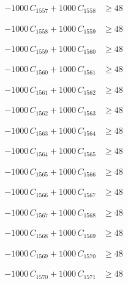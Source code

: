 \documentclass[a4paper,11pt]{article}
\begin{document}
\begin{align}
-1000\,C_{1557} + 1000\,C_{1558} &\geq 48 \nonumber
\end{align}

\begin{align}
-1000\,C_{1558} + 1000\,C_{1559} &\geq 48 \nonumber
\end{align}

\begin{align}
-1000\,C_{1559} + 1000\,C_{1560} &\geq 48 \nonumber
\end{align}

\begin{align}
-1000\,C_{1560} + 1000\,C_{1561} &\geq 48 \nonumber
\end{align}

\begin{align}
-1000\,C_{1561} + 1000\,C_{1562} &\geq 48 \nonumber
\end{align}

\begin{align}
-1000\,C_{1562} + 1000\,C_{1563} &\geq 48 \nonumber
\end{align}

\begin{align}
-1000\,C_{1563} + 1000\,C_{1564} &\geq 48 \nonumber
\end{align}

\begin{align}
-1000\,C_{1564} + 1000\,C_{1565} &\geq 48 \nonumber
\end{align}

\begin{align}
-1000\,C_{1565} + 1000\,C_{1566} &\geq 48 \nonumber
\end{align}

\begin{align}
-1000\,C_{1566} + 1000\,C_{1567} &\geq 48 \nonumber
\end{align}

\begin{align}
-1000\,C_{1567} + 1000\,C_{1568} &\geq 48 \nonumber
\end{align}

\begin{align}
-1000\,C_{1568} + 1000\,C_{1569} &\geq 48 \nonumber
\end{align}

\begin{align}
-1000\,C_{1569} + 1000\,C_{1570} &\geq 48 \nonumber
\end{align}

\begin{align}
-1000\,C_{1570} + 1000\,C_{1571} &\geq 48 \nonumber
\end{align}
\end{document}

